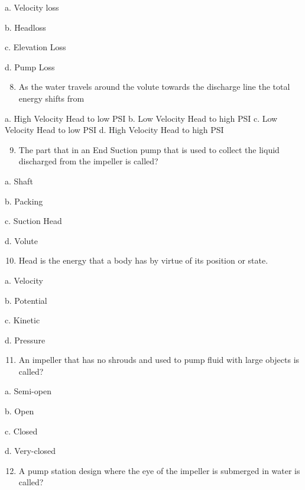 \documentclass[10pt]{article}
\begin{document}
\begin{enumerate}
\begin{enumerate}
a. Velocity loss

b. Headloss

c. Elevation Loss

d. Pump Loss

\begin{enumerate}
  \setcounter{enumi}{7}
  \item As the water travels around the volute towards the discharge line the total energy shifts from
\end{enumerate}

a. High Velocity Head to low PSI b. Low Velocity Head to high PSI c. Low Velocity Head to low PSI d. High Velocity Head to high PSI

\begin{enumerate}
  \setcounter{enumi}{8}
  \item The part that in an End Suction pump that is used to collect the liquid discharged from the impeller is called?
\end{enumerate}

a. Shaft

b. Packing

c. Suction Head

d. Volute

\begin{enumerate}
  \setcounter{enumi}{9}
  \item Head is the energy that a body has by virtue of its position or state.
\end{enumerate}

a. Velocity

b. Potential

c. Kinetic

d. Pressure

\begin{enumerate}
  \setcounter{enumi}{10}
  \item An impeller that has no shrouds and used to pump fluid with large objects is called?
\end{enumerate}

a. Semi-open

b. Open

c. Closed

d. Very-closed

\begin{enumerate}
  \setcounter{enumi}{11}
  \item A pump station design where the eye of the impeller is submerged in water is called?
\end{enumerate}


\end{enumerate}
\end{enumerate}
\end{document}
